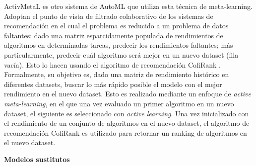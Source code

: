 ActivMetaL \cite{activmetal} es otro sistema de AutoML que utiliza esta técnica de meta-learning. Adoptan el punto de vista de filtrado colaborativo de los sistemas de recomendación en el cual el problema es reducido a un problema de datos faltantes: dado una matriz esparcidamente populada de rendimientos de algoritmos en determinadas tareas, predecir los rendimientos faltantes; más particularmente, predecir cuál algoritmo será mejor en un nuevo dataset (fila vacía). Esto lo hacen usando el algoritmo de recomendación CofiRank \cite{weimar2007cofirank}. Formalmente, su objetivo es, dado una matriz de rendimiento histórico en diferentes datasets, buscar lo más rápido posible el modelo con el mejor rendimiento en el nuevo dataset. Esto es realizado mediante un enfoque de \textit{active meta-learning}, en el que una vez evaluado un primer algoritmo en un nuevo dataset, el siguiente es seleccionado con \textit{active learning}. Una vez inicializado con el rendimiento de un conjunto de algoritmos en el nuevo dataset, el algoritmo de recomendación CofiRank es utilizado para retornar un ranking de algoritmos en el nuevo dataset. %

\quad

\textbf{Modelos sustitutos}


